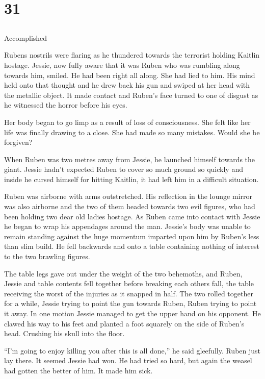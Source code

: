 \chapter{31}
\section{}
Accomplished  

Rubens nostrils were flaring as he thundered towards the terrorist holding Kaitlin hostage.  Jessie, now fully aware that it was Ruben who was rumbling along towards him, smiled.  He had been right all along.  She had lied to him.  His mind held onto that thought and he drew back his gun and swiped at her head with the metallic object.  It made contact and Ruben's face turned to one of disgust as he witnessed the horror before his eyes.

Her body began to go limp as a result of loss of consciousness.  She felt like her life was finally drawing to a close.  She had made so many mistakes.  Would she be forgiven?  

When Ruben was two metres away from Jessie, he launched himself towards the giant.  Jessie hadn't expected Ruben to cover so much ground so quickly and inside he cursed himself for hitting Kaitlin, it had left him in a difficult situation.

Ruben was airborne with arms outstretched.  His reflection in the lounge mirror was also airborne and the two of them headed towards two evil figures, who had been holding two dear old ladies hostage.  As Ruben came into contact with Jessie he began to wrap his appendages around the man.  Jessie's body was unable to remain standing against the huge momentum imparted upon him by Ruben's less than slim build.  He fell backwards and onto a table containing nothing of interest to the two brawling figures.  

The table legs gave out under the weight of the two behemoths, and Ruben, Jessie and table contents fell together before breaking each others fall, the table receiving the worst of the injuries as it snapped in half.  The two rolled together for a while, Jessie trying to point the gun towards Ruben, Ruben trying to point it away.  In one motion Jessie managed to get the upper hand on his opponent.  He clawed his way to his feet and planted a foot squarely on the side of Ruben's head.  Crushing his skull into the floor.

``I'm going to enjoy killing you after this is all done,'' he said gleefully.  Ruben just lay there.  It seemed Jessie had won.  He had tried so hard, but again the weasel had gotten the better of him.  It made him sick.

